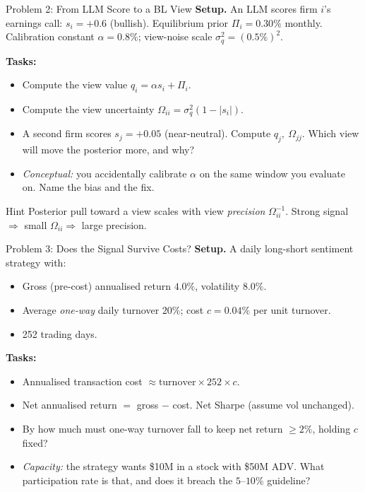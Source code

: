 \documentclass[9pt,t]{beamer}
\begin{document}
\begin{frame}{Problem 2: From LLM Score to a BL View}
\textbf{Setup.} An LLM scores firm $i$'s earnings call: $s_i=+0.6$ (bullish).
Equilibrium prior $\Pi_i=0.30\%$ monthly. Calibration constant $\alpha=0.8\%$;
view-noise scale $\sigma_q^2=(0.5\%)^2$.

\medskip
\textbf{Tasks:}
\begin{itemize}
  \item[\textbf{A.}] Compute the view value $q_i=\alpha s_i+\Pi_i$.
  \item[\textbf{B.}] Compute the view uncertainty $\Omega_{ii}=\sigma_q^2(1-|s_i|)$.
  \item[\textbf{C.}] A second firm scores $s_j=+0.05$ (near-neutral).
        Compute $q_j,\ \Omega_{jj}$. Which view will move the posterior more, and why?
  \item[\textbf{D.}] \emph{Conceptual:} you accidentally calibrate $\alpha$ on the same
        window you evaluate on. Name the bias and the fix.
\end{itemize}

\medskip
\begin{block}{Hint}
Posterior pull toward a view scales with view \emph{precision} $\Omega_{ii}^{-1}$.
Strong signal $\Rightarrow$ small $\Omega_{ii}\Rightarrow$ large precision.
\end{block}
\end{frame}

\begin{frame}{Problem 3: Does the Signal Survive Costs?}
\textbf{Setup.} A daily long-short sentiment strategy with:
\begin{itemize}
  \item Gross (pre-cost) annualised return $4.0\%$, volatility $8.0\%$.
  \item Average \emph{one-way} daily turnover $20\%$; cost $c=0.04\%$ per unit turnover.
  \item 252 trading days.
\end{itemize}

\medskip
\textbf{Tasks:}
\begin{itemize}
  \item[\textbf{A.}] Annualised transaction cost
        $\approx \text{turnover}\times 252\times c$.
  \item[\textbf{B.}] Net annualised return $=$ gross $-$ cost. Net Sharpe (assume vol unchanged).
  \item[\textbf{C.}] By how much must one-way turnover fall to keep net return $\ge 2\%$,
        holding $c$ fixed?
  \item[\textbf{D.}] \emph{Capacity:} the strategy wants \$10M in a stock with \$50M ADV.
        What participation rate is that, and does it breach the $5$--$10\%$ guideline?
\end{itemize}
\end{frame}
\end{document}
